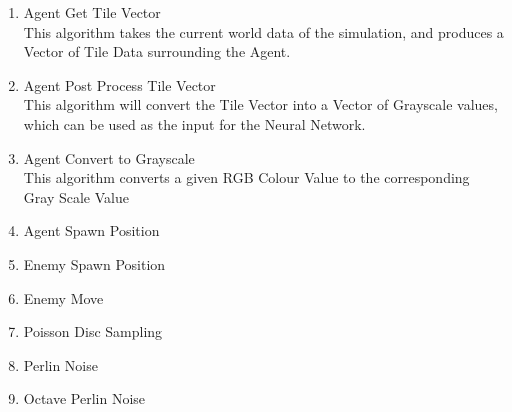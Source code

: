 \begin{flushleft}
\begin{enumerate}
\begin{enumerate}[label=\arabic*)]
                \vspace{0.5cm}
                \item Agent Get Tile Vector \\
                This algorithm takes the current world data of the simulation, and produces a Vector of Tile Data surrounding the Agent. 
                
                \vspace{0.5cm}
                \item Agent Post Process Tile Vector \\
                This algorithm will convert the Tile Vector into a Vector of Grayscale values, which can be used as the input for the Neural
                Network.
                
                \vspace{0.5cm}
                \item Agent Convert to Grayscale \\
                This algorithm converts a given RGB Colour Value to the corresponding Gray Scale Value

                \vspace{0.5cm}
                \item Agent Spawn Position \\
                
                \vspace{0.5cm}
                \item Enemy Spawn Position \\
                
                \vspace{0.5cm}
                \item Enemy Move \\
                
                \vspace{0.5cm}
                \item Poisson Disc Sampling \\
                
                \vspace{0.5cm}
                \item Perlin Noise \\
                
                \vspace{0.5cm}
                \item Octave Perlin Noise \\
                

\end{enumerate}
\end{enumerate}
\end{flushleft}
